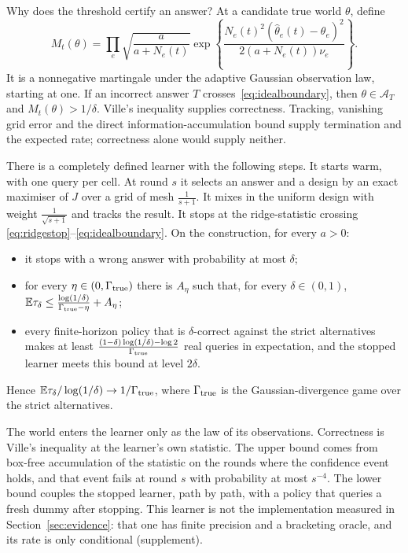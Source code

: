Why does the threshold certify an answer? At a candidate true world $\theta$, define
\[
M_t(\theta)=\prod_e\sqrt{\frac{a}{a+N_e(t)}}
\exp\left\{\frac{N_e(t)^2(\widehat\theta_e(t)-\theta_e)^2}
{2(a+N_e(t))\nu_e}\right\}.
\]
It is a nonnegative martingale under the adaptive Gaussian observation law, starting at one.
If an incorrect answer $T$ crosses~\eqref{eq:idealboundary}, then
$\theta\in\mathcal A_T$ and $M_t(\theta)>1/\delta$.
Ville's inequality supplies correctness. Tracking, vanishing grid error and the direct
information-accumulation bound supply termination and the expected rate; correctness alone
would supply neither.

\begin{theorem}
\label{thm:ideal}
There is a completely defined learner with the following steps. It starts warm, with one query
per cell. At round $s$ it selects an answer and a design by an exact maximiser of $J$ over a
grid of mesh $\frac{1}{s+1}$. It mixes in the uniform design with weight
$\frac{1}{\sqrt{s+1}}$ and tracks the result. It stops at the ridge-statistic crossing
\eqref{eq:ridgestop}--\eqref{eq:idealboundary}. On the construction,
for every $a>0$:
\begin{itemize}
\item it stops with a wrong answer with probability at most $\delta$;
\item for every $\eta\in(0,\Gamma_{\rm true})$ there is $A_{\eta}$ such that, for every
$\delta\in(0,1)$, $\mathbb{E}\tau_{\delta}\le\frac{\log(1/\delta)}{\Gamma_{\rm true}-\eta}+A_{\eta}$;
\item every finite-horizon policy that is $\delta$-correct against the strict alternatives
makes at least $\frac{(1-\delta)\log(1/\delta)-\log2}{\Gamma_{\rm true}}$ real queries in
expectation, and the stopped learner meets this bound at level $2\delta$.
\end{itemize}
Hence $\mathbb{E}\tau_{\delta}/\log(1/\delta)\to1/\Gamma_{\rm true}$, where $\Gamma_{\rm true}$ is
the Gaussian-divergence game over the strict alternatives.
\end{theorem}


The world enters the learner only as the law of its observations. Correctness is Ville's
inequality at the learner's own statistic. The upper bound comes from box-free accumulation of
the statistic on the rounds where the confidence event holds, and that event fails at round
$s$ with probability at most $s^{-4}$. The lower bound couples the stopped learner, path by
path, with a policy that queries a fresh dummy after stopping. This learner is not the
implementation measured in Section~\ref{sec:evidence}: that one has finite precision and a
bracketing oracle, and its rate is only conditional (supplement).

